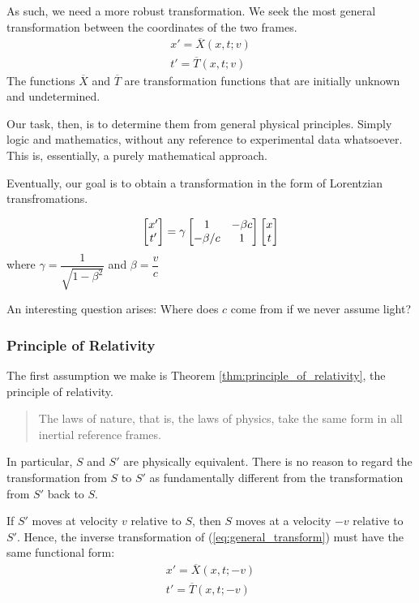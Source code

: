 		As such, we need a more robust transformation. We seek the most general 
		transformation between the coordinates of the two frames.
		\begin{align}
		    x' = \overline X(x,t;v)\\
			t' = \overline T(x,t;v)
			\label{eq:general_transform}
		\end{align}
		The functions $\overline X$ and $\overline T$ are transformation functions that are initially unknown and undetermined.

		Our task, then, is to determine them from general physical principles. Simply 
		logic and mathematics, without any reference to experimental data whatsoever.
		This is, essentially, a purely mathematical approach. 

		Eventually, our goal
		is to obtain a transformation in the form of Lorentzian transfromations.

		\begin{equation}
			\bmqty{
				x'\\ t'
			}
			=
			\gamma
			\bmqty{
				1 & -\beta c \\
				-\beta/c & 1
			}
			\bmqty{
				x\\t
			}
		\end{equation}
		where $\gamma = \dfrac{1}{\sqrt{1-\beta^2}}$ and $\beta = \dfrac{v}{c}$

		An interesting question arises: Where does $c$ come from if we never assume light?

		\subsubsection{Principle of Relativity}

		The first assumption we make is Theorem \ref{thm:principle_of_relativity}, the principle of relativity.
		\begin{quote}
		    The laws of nature, that is, the laws of physics, take the same form in all inertial reference frames.
		\end{quote}

		In particular, $S$ and $S'$ are physically equivalent. There is no reason to regard 
		the transformation from $S$ to $S'$ as fundamentally different from the transformation 
		from $S'$ back to $S$.

		If $S'$ moves at velocity $v$ relative to $S$, then $S$ moves at a velocity $-v$ relative 
		to $S'$. Hence, the inverse transformation of (\ref{eq:general_transform}) must have the same functional form:
		\begin{align*}
		    x' = \overline X(x,t;-v)\\
			t' = \overline T(x,t;-v)
		\end{align*}

